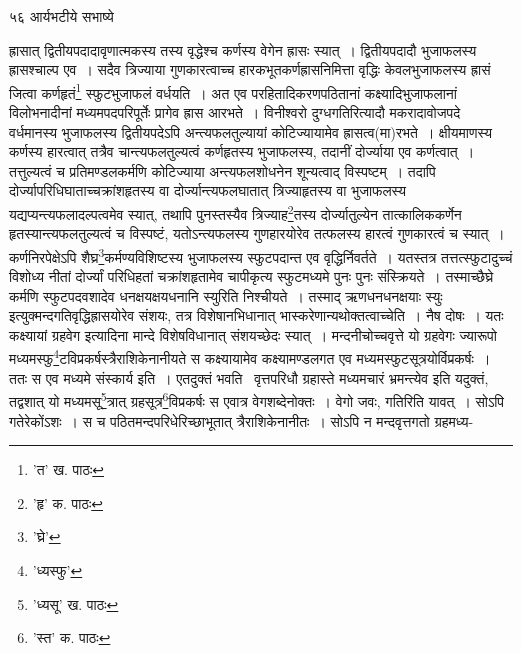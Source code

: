 \documentclass[11pt, openany]{book}
\begin{document}
{{{{{\newpage

\vspace{2cm} ५६ \hspace{4cm}आर्यभटीये सभाष्ये 

\vspace{0.3cm}
\noindent ह्रासात् द्वितीयपदादावृणात्मकस्य तस्य वृद्धेश्च कर्णस्य वेगेन ह्रासः स्यात्~। द्वितीयपदादौ भुजाफलस्य ह्रासश्चाल्प एव~। सदैव त्रिज्याया गुणकारत्वाच्च हारकभूतकर्णह्रासनिमित्ता वृद्धिः केवलभुजाफलस्य ह्रासं जित्वा कर्णहृतं\renewcommand{\thefootnote}{१}\footnote{'त' ख. पाठः} स्फुटभुजाफलं वर्धयति~। अत एव परहितादिकरणपठितानां कक्ष्यादिभुजाफलानां विलोभनादीनां मध्यमपदपरिपूर्तेः प्रागेव ह्रास आरभते~। विनीश्वरो दुग्धगतिरित्यादौ मकरादावोजपदे वर्धमानस्य भुजाफलस्य द्वितीयपदेऽपि अन्त्यफलतुल्यायां कोटिज्यायामेव ह्रासत्व(मा)रभते~। क्षीयमाणस्य कर्णस्य हारत्वात् तत्रैव चान्त्यफलतुल्यत्वं कर्णहृतस्य भुजाफलस्य, तदानीं दोर्ज्याया एव कर्णत्वात्~। तत्तुल्यत्वं च प्रतिमण्डलकर्मणि कोटिज्याया अन्त्यफलशोधनेन शून्यत्वाद् विस्पष्टम्~। तदापि दोर्ज्यापरिधिघाताच्चक्रांशहृतस्य वा दोर्ज्यान्त्यफलघातात् त्रिज्याहृतस्य वा भुजाफलस्य
यद्यप्यन्त्यफलादल्पत्वमेव स्यात्, तथापि पुनस्तस्यैव त्रिज्याह\renewcommand{\thefootnote}{२}\footnote{'हृ' क. पाठः}तस्य दोर्ज्यातुल्येन तात्कालिककर्णेन हृतस्यान्त्यफलतुल्यत्वं च विस्पष्टं, यतोऽन्त्यफलस्य गुणहारयोरेव तत्फलस्य हारत्वं गुणकारत्वं च स्यात्~। कर्णनिरपेक्षेऽपि शैघ्र\renewcommand{\thefootnote}{३}\footnote{'घ्रे'}कर्मण्यविशिष्टस्य भुजाफलस्य स्फुटपदान्त एव वृद्धिर्निवर्तते~। यतस्तत्र तत्तत्स्फुटादुच्चं विशोध्य नीतां दोर्ज्यां परिधिहतां चक्रांशहृतामेव चापीकृत्य स्फुटमध्यमे पुनः पुनः संस्क्रियते~। तस्माच्छैघ्रे कर्मणि स्फुटपदवशादेव धनक्षयक्षयधनानि स्युरिति निश्चीयते~। तस्माद् {\qt ऋणधनधनक्षयाः
स्युः} इत्युक्मन्दगतिवृद्धिह्रासयोरेव संशयः, तत्र विशेषानभिधानात् भास्करेणान्यथोक्तत्वाच्चेति~। नैष दोषः~। यतः {\qt कक्ष्यायां ग्रहवेग} इत्यादिना मान्दे विशेषविधानात् संशयच्छेदः स्यात्~। मन्दनीचोच्चवृत्ते यो ग्रहवेगः ज्यारूपो मध्यमस्फु\renewcommand{\thefootnote}{४}\footnote{'ध्यस्फु'}टविप्रकर्षस्त्रैराशिकेनानीयते स कक्ष्यायामेव
कक्ष्यामण्डलगत एव मध्यमस्फुटसूत्रयोर्विप्रकर्षः~। ततः स एव मध्यमे संस्कार्य इति~। एतदुक्तं भवति  \textendash\ {\qt वृत्तपरिधौ ग्रहास्ते मध्यमचारं भ्रमन्त्येव} इति यदुक्तं, तद्वशात् यो मध्यमसू\renewcommand{\thefootnote}{५}\footnote{'ध्यसू' ख. पाठः}त्रात् ग्रहसूत्र\renewcommand{\thefootnote}{६}\footnote{'स्त' क. पाठः}विप्रकर्षः स एवात्र वेगशब्देनोक्तः~। वेगो जवः, गतिरिति यावत्~। सोऽपि गतेरेकोंऽशः~। स च पठितमन्दपरिधेरिच्छाभूतात् त्रैराशिकेनानीतः~। सोऽपि न मन्दवृत्तगतो ग्रहमध्य-


\newpage

}}}}}
\end{document}
